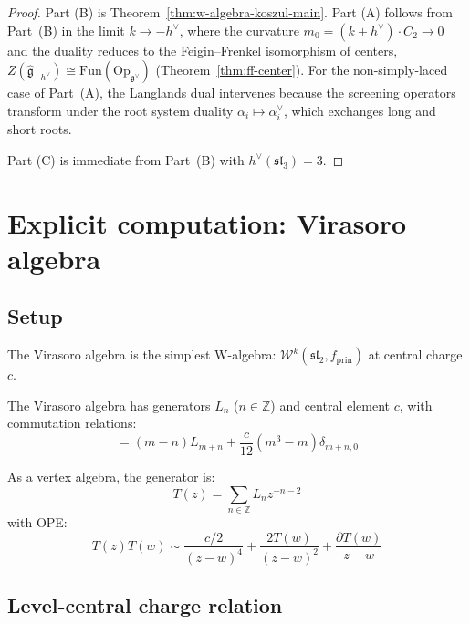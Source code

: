 \begin{proof}
Part (B) is Theorem~\ref{thm:w-algebra-koszul-main}.  Part (A) follows from Part~(B) in the limit $k \to -h^\vee$, where the curvature $m_0 = (k+h^\vee) \cdot C_2 \to 0$ and the duality reduces to the Feigin--Frenkel isomorphism of centers, $Z(\widehat{\mathfrak{g}}_{-h^\vee}) \cong \mathrm{Fun}(\mathrm{Op}_{\mathfrak{g}^\vee})$ (Theorem~\ref{thm:ff-center}).  For the non-simply-laced case of Part~(A), the Langlands dual intervenes because the screening operators transform under the root system duality $\alpha_i \mapsto \alpha_i^\vee$, which exchanges long and short roots.

Part (C) is immediate from Part~(B) with $h^\vee(\mathfrak{sl}_3) = 3$.
\end{proof}

\section{Explicit computation: Virasoro algebra}

\subsection{Setup}

The Virasoro algebra is the simplest W-algebra: $\mathcal{W}^k(\mathfrak{sl}_2, f_{\text{prin}})$ at central charge $c$.

\begin{definition}
The Virasoro algebra has generators $L_n$ ($n \in \mathbb{Z}$) and central element $c$, with commutation relations:
\begin{equation}
[L_m, L_n] = (m-n) L_{m+n} + \frac{c}{12}(m^3 - m)\delta_{m+n,0}
\end{equation}

As a vertex algebra, the generator is:
\begin{equation}
T(z) = \sum_{n \in \mathbb{Z}} L_n z^{-n-2}
\end{equation}
with OPE:
\begin{equation}
T(z)T(w) \sim \frac{c/2}{(z-w)^4} + \frac{2T(w)}{(z-w)^2} + \frac{\partial T(w)}{z-w}
\end{equation}
\end{definition}

\subsection{Level-central charge relation}

